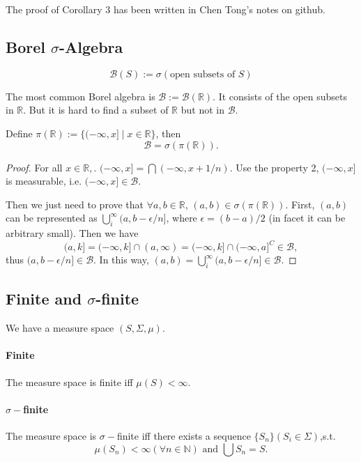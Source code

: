 The proof of Corollary 3 has been written in Chen Tong's notes on github.

\subsection{Borel $\sigma$-Algebra}
$$ \mathcal B(S) := \sigma(\text{open subsets of } S) $$

The most common Borel algebra is $\mathcal B := \mathcal B(\mathbb R)$. It consists of the open subsets in $\mathbb R$. But it is hard to find a subset of $\mathbb R$ but not in $\mathcal B$.

\begin{theorem}
Define $\pi(\mathbb R) := \{ (-\infty,x]\mid x\in \mathbb R\}$, then 
$$\mathcal B = \sigma(\pi(\mathbb R)).$$
\end{theorem}

\begin{proof}
  For all $x\in \mathbb R, $. $(-\infty,x] = \bigcap(-\infty,x+1/n)$. Use the property 2, $(-\infty,x]$ is measurable, i.e. $(-\infty,x]\in \mathcal B$.
  
  Then we just need to prove that $\forall a,b\in \mathbb R$, $(a,b)\in \sigma(\pi(\mathbb R))$. First, $(a,b)$ can be represented as $\bigcup_i^\infty (a,b-\epsilon/n]$, where $\epsilon = (b-a)/2$ (in facet it can be arbitrary small). Then we have 
  $$(a,k] = (-\infty,k] \cap (a,\infty) = (-\infty,k] \cap (-\infty,a]^C \in \mathcal B,$$
  thus $(a,b-\epsilon/n] \in \mathcal B$. In this way, $(a,b) = \bigcup_i^\infty (a,b-\epsilon/n] \in \mathcal B$. 
\end{proof}

\subsection{Finite and $\sigma$-finite}
We have a measure space $(S,\Sigma,\mu)$.
\paragraph{Finite} The measure space is finite iff $\mu(S) < \infty$.


\paragraph{$\sigma-$finite} The measure space is $\sigma-$finite iff there exists a sequence $\{S_n\}(S_i\in \Sigma)$,s.t.
$$\mu(S_n) < \infty (\forall n\in \mathbb N) \text{ and } \bigcup S_n = S.$$

